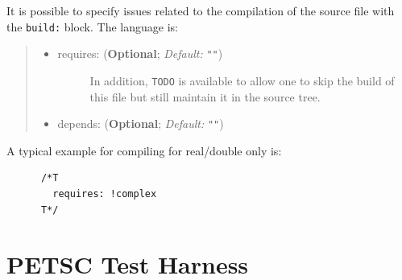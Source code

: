 It is possible to specify issues related to the compilation of the
source file with the \lstinline{build:} block.  The language is:
%
\begin{quote}
%
\begin{itemize}

\item %
\begin{description}
\item[{requires: (\textbf{Optional}; \emph{Default:} \lstinline{""})}] \leavevmode \setcounter{listcnt0}{0}
In addition, \lstinline{TODO}  is available to allow one to skip the
build of this file but still maintain it in the source tree.

\end{description}

\item %
\begin{description}
\item[{depends: (\textbf{Optional}; \emph{Default:} \lstinline{""})}] \leavevmode \setcounter{listcnt0}{0}

\end{description}

\end{itemize}

\end{quote}

A typical example for compiling for real/double only is:
%
\begin{lstlisting}
      /*T
        requires: !complex
      T*/
\end{lstlisting}


\section{PETSC Test Harness%
  \label{petsc-test-harness}%
}


